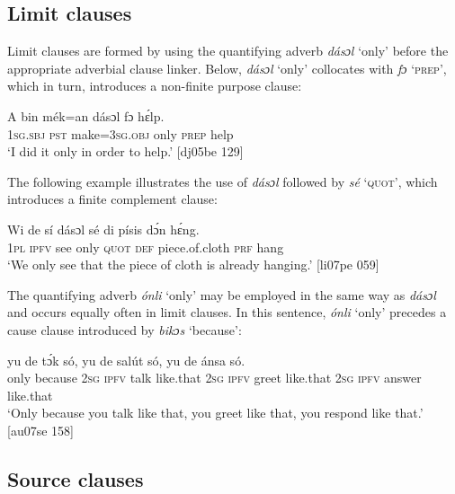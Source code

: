 \subsection{Limit clauses}\label{sec:10.7.9}

Limit clauses are formed by using the quantifying adverb \textit{dásɔl} ‘only’ before the appropriate adverbial clause linker. Below, \textit{dásɔl} ‘only’ collocates with \textit{fɔ} ‘\textsc{prep}’, which in turn, introduces a non-finite purpose clause: 


\ea%
    \label{ex:key:1514}
    \gll A    bin  mék=an    dásɔl  fɔ  hɛ́lp.\\
\textsc{1sg.sbj}  \textsc{pst}  make=\textsc{3sg.obj}  only    \textsc{prep}  help\\

\glt ‘I did it only in order to help.’ [dj05be 129]
\z

The following example illustrates the use of \textit{dásɔl} followed by \textit{sé} ‘\textsc{quot}’, which introduces a finite complement clause: 


\ea%
    \label{ex:key:1515}
    \gll Wi  de  sí  dásɔl  sé    di  písis        dɔ́n  hɛ́ng.\\
\textsc{1pl}  \textsc{ipfv}  see  only    \textsc{quot}    \textsc{def}  piece.of.cloth    \textsc{prf}  hang\\

\glt ‘We only see that the piece of cloth is already hanging.’ [li07pe 059]
\z

The quantifying adverb \textit{ónli} ‘only’ may be employed in the same way as \textit{dásɔl} and occurs equally often in limit clauses. In this sentence, \textit{ónli} ‘only’ precedes a cause clause introduced by \textit{bikɔs} ‘because’: 


\ea%
    \label{ex:key:1516}
    \gll {}      yu  de  tɔ́k  só,    yu  de  salút  só,
yu  de  ánsa    só.\\
only    because  \textsc{2sg}  \textsc{ipfv}  talk  like.that  \textsc{2sg}  \textsc{ipfv}  greet  like.that
\textsc{2sg}  \textsc{ipfv}  answer  like.that \\

\glt ‘Only because you talk like that, you greet like that, you respond like that.’ [au07se 158]
\z

\subsection{Source clauses}\label{sec:10.7.10}

